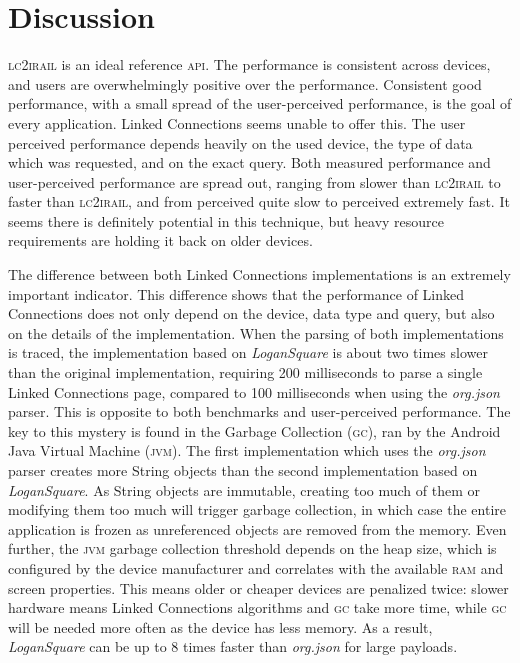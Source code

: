 \documentclass[twocolumn]{phdsymp} %
\begin{document}
\section{Discussion}
\textsc{lc2irail} is an ideal reference \textsc{api}. The performance is consistent across devices, and users are overwhelmingly positive over the performance. Consistent good performance, with a small spread of the user-perceived performance, is the goal of every application. Linked Connections seems unable to offer this. The user perceived performance depends heavily on the used device, the type of data which was requested, and on the exact query. Both measured performance and user-perceived performance are spread out, ranging from slower than \textsc{lc2irail} to faster than \textsc{lc2irail}, and from perceived quite slow to perceived extremely fast. It seems there is definitely potential in this technique, but heavy resource requirements are holding it back on older devices.

The difference between both Linked Connections implementations is an extremely important indicator. This difference shows that the performance of Linked Connections
does not only depend on the device, data type and query, but also on the details of the implementation. When the parsing of both implementations is traced, the implementation based on \emph{LoganSquare} is about two times slower than the original implementation, requiring 200 milliseconds to parse a single Linked Connections page, compared to 100 milliseconds when using the \emph{org.json} parser. This is opposite to both benchmarks and user-perceived performance. The key to this mystery is found in the Garbage Collection (\textsc{gc}), ran by the Android Java Virtual Machine (\textsc{jvm}). The first implementation which uses the \emph{org.json} parser creates more String objects than the second implementation based on \emph{LoganSquare}. As String objects are immutable, creating too much of them or modifying them too much will trigger garbage collection, in which case the entire application is frozen as unreferenced objects are removed from the memory. Even further, the \textsc{jvm} garbage collection threshold depends on the heap size, which is configured by the device manufacturer and correlates with the available \textsc{ram} and screen properties. This
means older or cheaper devices are penalized twice: slower hardware means Linked Connections algorithms and \textsc{gc} take more time, while \textsc{gc} will be needed more often as the device has less memory. As a result, \emph{LoganSquare} can be up to 8 times faster than \emph{org.json} for large payloads.
\end{document}
